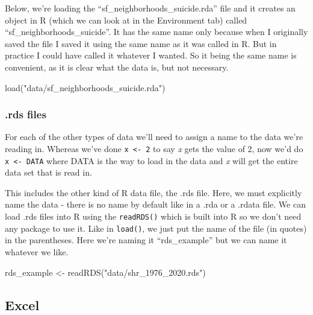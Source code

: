 \documentclass[
]{krantz}
\makeatletter
\newenvironment{Shaded}{\begin{snugshade}}{\end{snugshade}}
\newcommand{\FunctionTok}[1]{\textcolor[rgb]{0,0,0}{#1}}
\newcommand{\NormalTok}[1]{#1}
\newcommand{\OtherTok}[1]{\textcolor[rgb]{0.37,0.37,0.37}{#1}}
\newcommand{\StringTok}[1]{\textcolor[rgb]{0.5,0.5,0.5}{#1}}
\newenvironment{kframe}{%
\medskip{}
\setlength{\fboxsep}{.8em}
 \def\at@end@of@kframe{}%
 \ifinner\ifhmode%
  \def\at@end@of@kframe{\end{minipage}}%
  \begin{minipage}{\columnwidth}%
 \fi\fi%
 \def\FrameCommand##1{\hskip\@totalleftmargin \hskip-\fboxsep
 \colorbox{shadecolor}{##1}\hskip-\fboxsep
     \hskip-\linewidth \hskip-\@totalleftmargin \hskip\columnwidth}%
 \MakeFramed {\advance\hsize-\width
   \@totalleftmargin\z@ \linewidth\hsize
   \@setminipage}}%
 {\par\unskip\endMakeFramed%
 \at@end@of@kframe}
\renewenvironment{Shaded}{\begin{kframe}}{\end{kframe}}
\makeatother
\begin{document}
Below, we're loading the ``sf\_neighborhoods\_suicide.rda''
file and it creates an object in R (which we can look at in
the Environment tab) called ``sf\_neighborhoods\_suicide''.
It has the same name only because when I originally saved
the file I saved it using the same name as it was called in
R. But in practice I could have called it whatever I wanted.
So it being the same name is convenient, as it is clear what
the data is, but not necessary.

\begin{Shaded}
\begin{Highlighting}[]
\FunctionTok{load}\NormalTok{(}\StringTok{"data/sf\_neighborhoods\_suicide.rda"}\NormalTok{)}
\end{Highlighting}
\end{Shaded}

\hypertarget{rds-files}{%
\subsubsection{.rds files}\label{rds-files}}

For each of the other types of data we'll need to assign a
name to the data we're reading in. Whereas we've done
\texttt{x\ \textless{}-\ 2} to say \emph{x} gets the value
of 2, now we'd do \texttt{x\ \textless{}-\ DATA} where DATA
is the way to load in the data and \emph{x} will get the
entire data set that is read in.

This includes the other kind of R data file, the .rds file.
Here, we must explicitly name the data - there is no name by
default like in a .rda or a .rdata file. We can load .rds
files into R using the \texttt{readRDS()} which is built
into R so we don't need any package to use it. Like in
\texttt{load()}, we just put the name of the file (in
quotes) in the parentheses. Here we're naming it
``rds\_example'' but we can name it whatever we like.

\begin{Shaded}
\begin{Highlighting}[]
\NormalTok{rds\_example }\OtherTok{\textless{}{-}} \FunctionTok{readRDS}\NormalTok{(}\StringTok{"data/shr\_1976\_2020.rds"}\NormalTok{)}
\end{Highlighting}
\end{Shaded}

\hypertarget{excel}{%
\subsection{Excel}\label{excel}}
\end{document}

